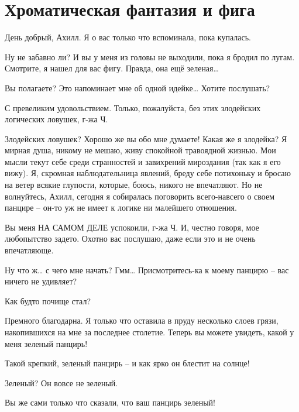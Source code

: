 \documentclass[../main.tex]{subfiles}
\begin{document}
\section{Хроматическая фантазия и фига}


\begin{Dialogue}

 День добрый, Ахилл. Я о вас только что вспоминала, пока купалась.

 Ну не забавно ли? И вы у меня из головы не выходили, пока я бродил по лугам. Смотрите, я нашел для вас фигу. Правда, она ещё зеленая\ldots{}

 Вы полагаете? Это напоминает мне об одной идейке\ldots{} Хотите послушать?

 С превеликим удовольствием. Только, пожалуйста, без этих злодейских логических ловушек, г-жа Ч\@.

 Злодейских ловушек? Хорошо же вы обо мне думаете! Какая же я злодейка? Я мирная душа, никому не мешаю, живу спокойной травоядной жизнью. Мои мысли текут себе среди странностей и завихрений мироздания (так как я его вижу). Я, скромная наблюдательница явлений, бреду себе потихоньку и бросаю на ветер всякие глупости, которые, боюсь, никого не впечатляют. Но не волнуйтесь, Ахилл, сегодня я собиралась поговорить всего-навсего о своем панцире \--- он-то уж не имеет к логике ни малейшего отношения.

 Вы меня НА САМОМ ДЕЛЕ успокоили, г-жа Ч\@. И, честно говоря, мое любопытство задето. Охотно вас послушаю, даже если это и не очень впечатляюще.

 Ну что ж\ldots{} с чего мне начать? Гмм\ldots{} Присмотритесь-ка к моему панцирю \--- вас ничего не удивляет?

 Как будто почище стал?

 Премного благодарна. Я только что оставила в пруду несколько слоев грязи, накопившихся на мне за последнее столетие. Теперь вы можете увидеть, какой у меня зеленый панцирь!

 Такой крепкий, зеленый панцирь \--- и как ярко он блестит на солнце!

 Зеленый? Он вовсе не зеленый.

 Вы же сами только что сказали, что ваш панцирь зеленый!


\end{Dialogue}
\end{document}
